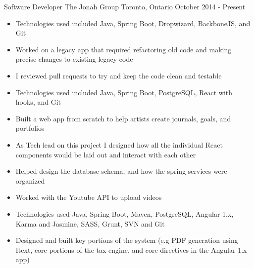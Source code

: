 
\begin{cventries}
    \cventry
    {Software Developer}
    {The Jonah Group}
    {Toronto, Ontario}
    {October 2014 - Present}
    {
        \renewcommand{\labelitemii}{\bullet}
        \begin{cvitems}
            \item[] {
                \begin{itemize}
                    \item {Technologies used included Java, Spring Boot, Dropwizard, BackboneJS, and Git}
                    \item {Worked on a legacy app that required refactoring old code and making precise changes to existing legacy code}
                    \item {I reviewed pull requests to try and keep the code clean and testable}
                \end{itemize}
            }
            \item[] {
                \begin{itemize}
                    \item {Technologies used included Java, Spring Boot, PostgreSQL, React with hooks, and Git}
                    \item {Built a web app from scratch to help artists create journals, goals, and portfolios}
                    \item {As Tech lead on this project I designed how all the individual React components would be laid out and interact with each other}
                    \item {Helped design the database schema, and how the spring services were organized}
                    \item {Worked with the Youtube API to upload videos}
                \end{itemize}
            }
            \item[] {
                \begin{itemize}
                    \item {Technologies used Java, Spring Boot, Maven, PostgreSQL, Angular 1.x, Karma and Jasmine, SASS, Grunt, SVN and Git}
                    \item {Designed and built key portions of the system (e.g PDF generation using Itext, core portions of the tax engine, and core directives in the Angular 1.x app)}

\end{itemize}}
\end{cvitems}}
\end{cventries}
